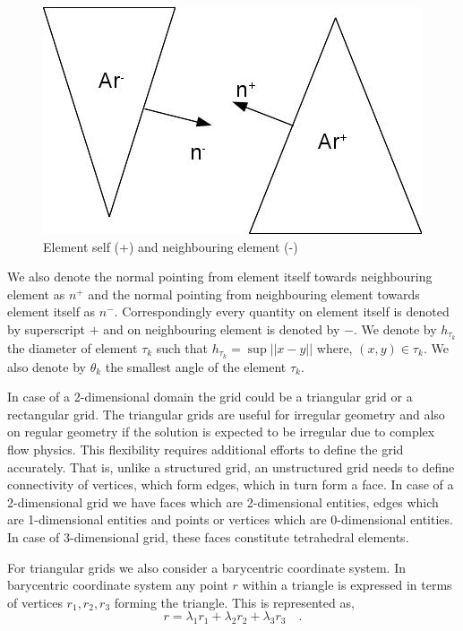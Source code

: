 \documentclass[a4paper,openany]{book}
\begin{document}
\begin{figure}
\centering
  \includegraphics[width=\linewidth]{ch_3_fig_1.jpg}
  \caption{Element self (+) and neighbouring element (-)}
  \label{fig:Self_neighbour}
\end{figure}

We also denote the normal pointing from element itself towards neighbouring element as $n^+$ and the normal pointing from neighbouring element towards element itself as $n^-$. Correspondingly every quantity on element itself is denoted by superscript $+$ and on neighbouring element is denoted by $-$.  We denote by $h_{\tau_k}$ the diameter of element $\tau_k$ such that $h_{\tau_k} = \sup ||x-y||$ where, $(x,y) \in \tau_k$. We also denote by $\theta_k$ the smallest angle of the element $\tau_k$.

In case of a 2-dimensional domain the grid could be a triangular grid or a rectangular grid. The triangular grids are useful for irregular geometry and also on regular geometry if the solution is expected to be irregular due to complex flow physics. This flexibility requires additional efforts to define the grid accurately. That is, unlike a structured grid, an unstructured grid needs to define connectivity of vertices, which form edges, which in turn form a face. In case of a 2-dimensional grid we have faces which are 2-dimensional entities, edges which are 1-dimensional entities and points or vertices which are 0-dimensional entities. In case of 3-dimensional grid, these faces constitute tetrahedral elements. 

For triangular grids we also consider a barycentric coordinate system. In barycentric coordinate system any point $r$ within a triangle is expressed in terms of vertices $r_1,r_2,r_3$ forming the triangle. This is represented as, \begin{equation}\label{barycentric point}
r = \lambda_1 r_1 + \lambda_2 r_2 + \lambda_3 r_3 \quad \textrm{.}
\end{equation}
\end{document}

